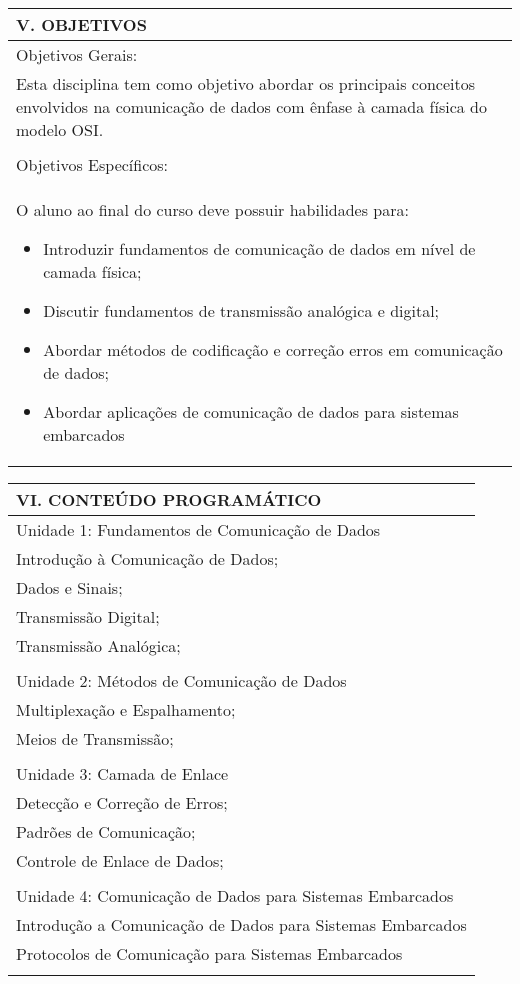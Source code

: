 \documentclass[12pt]{article}
\begin{document}
\begin{longtable}{|L{1.025\textwidth}|} \hline
%
{\bf V. OBJETIVOS } \\ \hline
Objetivos Gerais:\\ 
Esta disciplina tem como objetivo abordar os principais conceitos envolvidos na comunicação de dados com ênfase à camada física do modelo OSI.\\
\\
Objetivos Específicos: \\
O aluno ao final do curso deve possuir habilidades para:
\begin{itemize}
\item Introduzir fundamentos de comunicação de dados em nível de camada física;
\item Discutir fundamentos de transmissão analógica e digital;
\item Abordar métodos de codificação e correção erros em comunicação de dados;
\item Abordar aplicações de comunicação de dados para sistemas embarcados
\end{itemize}
\\ \hline
\end{longtable}


\begin{longtable}{|L{1.025\textwidth}|} \hline
%
{\bf VI. CONTEÚDO PROGRAMÁTICO } \\ \hline
Unidade 1: Fundamentos de Comunicação de Dados\\
Introdução à Comunicação de Dados;\\
Dados e Sinais;\\
Transmissão Digital;\\
Transmissão Analógica;\\
\\
Unidade 2: Métodos de Comunicação de Dados\\
Multiplexação e Espalhamento;\\
Meios de Transmissão;\\
\\
Unidade 3: Camada de Enlace\\
Detecção e Correção de Erros;\\
Padrões de Comunicação;\\
Controle de Enlace de Dados;\\
\\
Unidade 4: Comunicação de Dados para Sistemas Embarcados\\
Introdução a Comunicação de Dados para Sistemas Embarcados\\
Protocolos de Comunicação para Sistemas Embarcados\\
\\ \hline
\end{longtable} 
\end{document}
